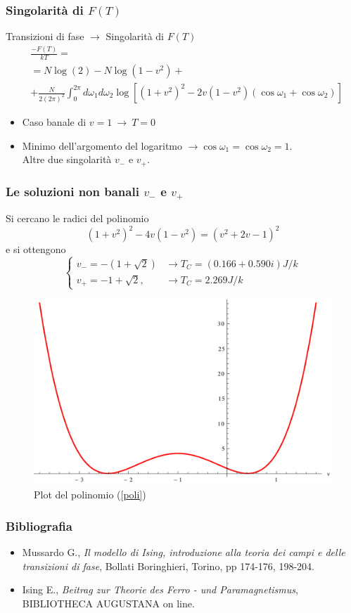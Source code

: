 \documentclass[11pt]{beamer}
\DeclareMathOperator{\Log}{log}
\begin{document}
\begin{frame}
\frametitle{Singolarità di $F(T)$}
Transizioni di fase $\to$ Singolarità di $F(T)$
\begin{equation}
\begin{split}
&\frac{-F(T)}{kT}=\\
&=N\Log(2)-N\Log(1-v^2)+
\\&+\frac{N}{2(2\pi)^2}\int_0^{2\pi} d\omega_1 d\omega_2 \Log\left[(1+v^2)^2-2v(1-v^2) \left( \cos{\omega_1}+\cos{\omega_2} \right) \right]
\end{split}
\end{equation}
\begin{itemize}
\item{Caso banale di $v=1 \ \to \ T=0$}
\item{Minimo dell'argomento del logaritmo $\to \cos\omega_1 = \cos\omega_2=1$. \\
Altre due singolarità $v_-$ e $v_+$.}
\end{itemize}
\end{frame}

\begin{frame}
\frametitle{Le soluzioni non banali $v_-$ e $v_+$}
Si cercano le radici del polinomio
\begin{equation}\label{poli}
(1+v^2)^2-4v(1-v^2)=(v^2+2v-1)^2
\end{equation}
e si ottengono
$$
\begin{cases} v_-=-(1+\sqrt{2}) & \to T_C = (0.166+0.590i)J/k  \\ v_+= -1+\sqrt{2}, & \to T_C=2.269 J/k
\end{cases}
$$

\begin{figure}[r]
	\centering
	\includegraphics[width=0.5\columnwidth]{singo}
	\caption{Plot del polinomio (\ref{poli})}
	\label{fig1}
	\end{figure}

\end{frame}

\begin{frame}
\frametitle{Bibliografia}
\begin{itemize}
\item{Mussardo G., \emph{Il modello di Ising, introduzione alla teoria dei campi e delle transizioni di fase}, Bollati Boringhieri, Torino, pp 174-176, 198-204.}
\item{Ising E., \emph{Beitrag zur Theorie des
Ferro - und Paramagnetismus}, BIBLIOTHECA AUGUSTANA on line.}
\end{itemize}

\end{frame}
\end{document}
